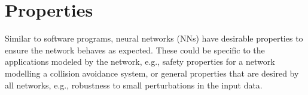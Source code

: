 \documentclass[oneside,11pt,dvipsnames]{book}
\numberwithin{equation}{section}
\theoremstyle{definition}
\theoremstyle{remark}
\begin{document}










\chapter{Properties}\label{chap:properties}

Similar to software programs, neural networks (NNs) have desirable properties to ensure the network behaves as expected. These could be specific to the applications modeled by the network, e.g., safety properties for a network modelling a collision avoidance system, or general properties that are desired by all networks, e.g., robustness to small perturbations in the input data.
\end{document}
